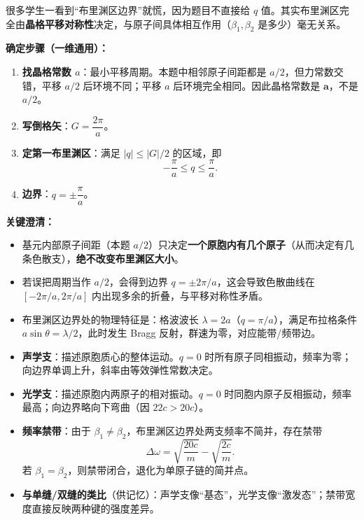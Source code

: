 \begin{warnbox}
很多学生一看到``布里渊区边界''就慌，因为题目不直接给 $q$ 值。其实布里渊区完全由\textbf{晶格平移对称性}决定，与原子间具体相互作用（$\beta_1,\beta_2$ 是多少）毫无关系。

\textbf{确定步骤（一维通用）：}
\begin{enumerate}
    \item \textbf{找晶格常数 $a$}：最小平移周期。本题中相邻原子间距都是 $a/2$，但力常数交错，平移 $a/2$ 后环境不同；平移 $a$ 后环境完全相同。因此晶格常数是 $\bm{a}$，不是 $a/2$。
    \item \textbf{写倒格矢}：$G = \dfrac{2\pi}{a}$。
    \item \textbf{定第一布里渊区}：满足 $|q|\le |G|/2$ 的区域，即
    \[
    \boxed{-\frac{\pi}{a} \le q \le \frac{\pi}{a}}.
    \]
    \item \textbf{边界}：$q = \pm \dfrac{\pi}{a}$。
\end{enumerate}

\textbf{关键澄清：}
\begin{itemize}
    \item 基元内部原子间距（本题 $a/2$）只决定\textbf{一个原胞内有几个原子}（从而决定有几条色散支），\textbf{绝不改变布里渊区大小}。
    \item 若误把周期当作 $a/2$，会得到边界 $q=\pm 2\pi/a$，这会导致色散曲线在 $[-2\pi/a,2\pi/a]$ 内出现多余的折叠，与平移对称性矛盾。
    \item 布里渊区边界处的物理特征是：格波波长 $\lambda = 2a$（$q=\pi/a$），满足布拉格条件 $a\sin\theta = \lambda/2$，此时发生 Bragg 反射，群速为零，对应能带/频带边。
\end{itemize}
\end{warnbox}

\begin{insightbox}[色散关系的物理图像]
\begin{itemize}
    \item \textbf{声学支}：描述原胞质心的整体运动。$q=0$ 时所有原子同相振动，频率为零；向边界单调上升，斜率由等效弹性常数决定。
    \item \textbf{光学支}：描述原胞内两原子的相对振动。$q=0$ 时同胞内原子反相振动，频率最高；向边界略向下弯曲（因 $22c>20c$）。
    \item \textbf{频率禁带}：由于 $\beta_1\neq\beta_2$，布里渊区边界处两支频率不简并，存在禁带
    \[
    \Delta\omega = \sqrt{\frac{20c}{m}} - \sqrt{\frac{2c}{m}}.
    \]
    若 $\beta_1=\beta_2$，则禁带闭合，退化为单原子链的简并点。
    \item \textbf{与单缝/双缝的类比}（供记忆）：声学支像``基态''，光学支像``激发态''；禁带宽度直接反映两种键的强度差异。
\end{itemize}
\end{insightbox}

